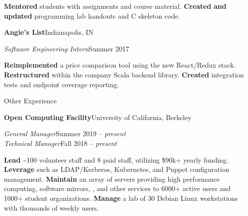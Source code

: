 \begin{minipage}[t]{0.665\textwidth}
\begin{adjustwidth}{10pt}{}
    \textbf{Mentored} students with assignments and course material.
    \textbf{Created and updated} programming lab handouts and C skeleton code.
  \end{adjustwidth}

  \vspace{5pt}
  \textbf{Angie's List}\quad{}\hfill Indianapolis, IN
  \begin{adjustwidth}{10pt}{}
    \emph{Software Engineering Intern}\hfill Summer 2017

    \textbf{Reimplemented} a price comparison tool using the new React/Redux stack.
    \textbf{Restructured}  within the company Scala backend library.
    \textbf{Created} integration tests and endpoint coverage reporting.
  \end{adjustwidth}





  \vspace{10pt}

  {\sectionfont Other Experience}

  \vspace{5pt}
  \textbf{Open Computing Facility}\quad{}\hfill University of California, Berkeley
  \begin{adjustwidth}{10pt}{}
    \emph{General Manager}\hfill Summer 2019 -- \emph{present}\\
    \emph{Technical Manager}\hfill Fall 2018 -- \emph{present}

    \textbf{Lead} \textasciitilde{}100 volunteer staff and 8 paid staff, utilizing \$90k+ yearly funding.
    \textbf{Leverage}  such as LDAP/Kerberos, Kubernetes, and Puppet configuration management.
    \textbf{Maintain} an array of servers providing high performance computing, software mirrors, , and other services to 6000+ active users and 1000+ student organizations.
    \textbf{Manage} a lab of 30 Debian Linux workstations with thousands of weekly users.


\end{adjustwidth}
\end{minipage}
